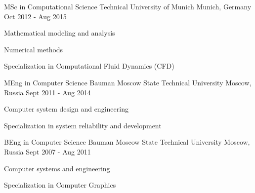 

\begin{cventries}
  \cventry
    {MSc in Computational Science} %
    {Technical University of Munich} %
    {Munich, Germany} %
    {Oct 2012 - Aug 2015} %
    {
      \begin{cvitems} %
        \item {Mathematical modeling and analysis}
        \item {Numerical methods}
        \item {Specialization in Computational Fluid Dynamics (CFD)}
      \end{cvitems}
    }
  \cventry
    {MEng in Computer Science} %
    {Bauman Moscow State Technical University} %
    {Moscow, Russia} %
    {Sept 2011 - Aug 2014} %
    {
      \begin{cvitems} %
        \item {Computer system design and engineering}
        \item {Specialization in system reliability and development}
      \end{cvitems}
    }
  \cventry
    {BEng in Computer Science}
    {Bauman Moscow State Technical University} %
    {Moscow, Russia} %
    {Sept 2007 - Aug 2011} %
    {
      \begin{cvitems} %
        \item {Computer systems and engineering}
        \item {Specialization in Computer Graphics}
      \end{cvitems}
    }
\end{cventries}
